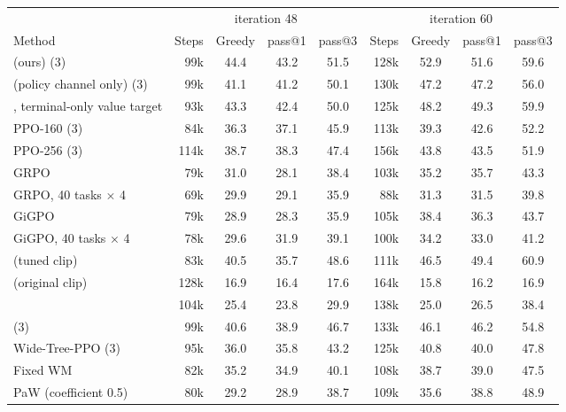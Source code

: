 \begin{tabular}{l r c c c r c c c }
\toprule
 & \multicolumn{4}{c}{iteration 48} & \multicolumn{4}{c}{iteration 60} \\
\cmidrule(lr){2-5}\cmidrule(lr){6-9}
Method & Steps & Greedy & pass@1 & pass@3 & Steps & Greedy & pass@1 & pass@3 \\
\midrule
\wmppo{} (ours) (3) & 99k & 44.4 & 43.2 & 51.5 & 128k & 52.9 & 51.6 & 59.6 \\
\wmppo{} (policy channel only) (3) & 99k & 41.1\sigup{} & 41.2\sigup{} & 50.1 & 130k & 47.2\sigup{} & 47.2\sigup{} & 56.0 \\
\wmppo{}, terminal-only value target & 93k & 43.3 & 42.4 & 50.0 & 125k & 48.2\sigup{} & 49.3 & 59.9 \\
PPO-160 (3) & 84k & 36.3\sigup{} & 37.1\sigup{} & 45.9 & 113k & 39.3\sigup{} & 42.6\sigup{} & 52.2 \\
PPO-256 (3) & 114k & 38.7\sigup{} & 38.3\sigup{} & 47.4 & 156k & 43.8\sigup{} & 43.5\sigup{} & 51.9 \\
GRPO & 79k & 31.0\sigup{} & 28.1\sigup{} & 38.4 & 103k & 35.2\sigup{} & 35.7\sigup{} & 43.3 \\
GRPO, 40 tasks $\times$ 4 & 69k & 29.9\sigup{} & 29.1\sigup{} & 35.9 & 88k & 31.3\sigup{} & 31.5\sigup{} & 39.8 \\
GiGPO & 79k & 28.9\sigup{} & 28.3\sigup{} & 35.9 & 105k & 38.4\sigup{} & 36.3\sigup{} & 43.7 \\
GiGPO, 40 tasks $\times$ 4 & 78k & 29.6\sigup{} & 31.9\sigup{} & 39.1 & 100k & 34.2\sigup{} & 33.0\sigup{} & 41.2 \\
\sopo{} (tuned clip) & 83k & 40.5 & 35.7\sigup{} & 48.6 & 111k & 46.5\sigup{} & 49.4 & 60.9 \\
\sopo{} (original clip) & 128k & 16.9\sigup{} & 16.4\sigup{} & 17.6 & 164k & 15.8\sigup{} & 16.2\sigup{} & 16.9 \\
\steppo{} & 104k & 25.4\sigup{} & 23.8\sigup{} & 29.9 & 138k & 25.0\sigup{} & 26.5\sigup{} & 38.4 \\
\qppo{} (3) & 99k & 40.6\sigup{} & 38.9\sigup{} & 46.7 & 133k & 46.1\sigup{} & 46.2\sigup{} & 54.8 \\
Wide-Tree-PPO (3) & 95k & 36.0\sigup{} & 35.8\sigup{} & 43.2 & 125k & 40.8\sigup{} & 40.0\sigup{} & 47.8 \\
Fixed WM & 82k & 35.2\sigup{} & 34.9\sigup{} & 40.1 & 108k & 38.7\sigup{} & 39.0\sigup{} & 47.5 \\
PaW (coefficient 0.5) & 80k & 29.2\sigup{} & 28.9\sigup{} & 38.7 & 109k & 35.6\sigup{} & 38.8\sigup{} & 48.9 \\

\end{tabular}
